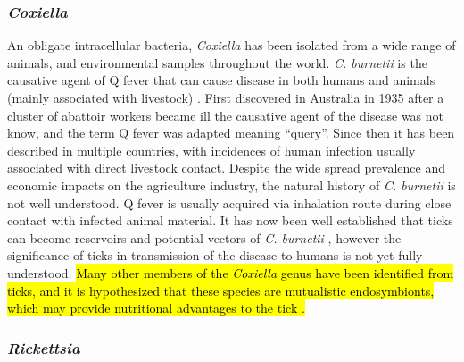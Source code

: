 \documentclass[a4paper, nobind]{templates/ociamthesis}
\begin{document}
\hypertarget{coxiella}{%
\subsubsection{\texorpdfstring{\emph{Coxiella}}{Coxiella}}\label{coxiella}}

An obligate intracellular bacteria, \emph{Coxiella} has been isolated from a wide range of animals, and environmental samples throughout the world.
\emph{C. burnetii} is the causative agent of Q fever that can cause disease in both humans and animals (mainly associated with livestock) \autocite{gonzalez-barrioCoxiellaBurnetiiWild2018}.
First discovered in Australia in 1935 after a cluster of abattoir workers became ill \autocite{derrickFEVERNEWFEVER1937} the causative agent of the disease was not know, and the term Q fever was adapted meaning ``query''.
Since then it has been described in multiple countries, with incidences of human infection usually associated with direct livestock contact.
Despite the wide spread prevalence and economic impacts on the agriculture industry, the natural history of \emph{C. burnetii} is not well understood.
Q fever is usually acquired via inhalation route during close contact with infected animal material.
It has now been well established that ticks can become reservoirs and potential vectors of \emph{C. burnetii} \autocite{arricau-bouveryFeverEmergingReemerging2005}, however the significance of ticks in transmission of the disease to humans is not yet fully understood.
\hl{Many other members of the \emph{Coxiella} genus have been identified from ticks, and it is hypothesized that these species are mutualistic endosymbionts, which may provide nutritional advantages to the tick \autocite{kobayashiMolecularDetectionGenotyping2021}.}

\hypertarget{rickettsia}{%
\subsubsection{\texorpdfstring{\emph{Rickettsia}}{Rickettsia}}\label{rickettsia}}
\end{document}
